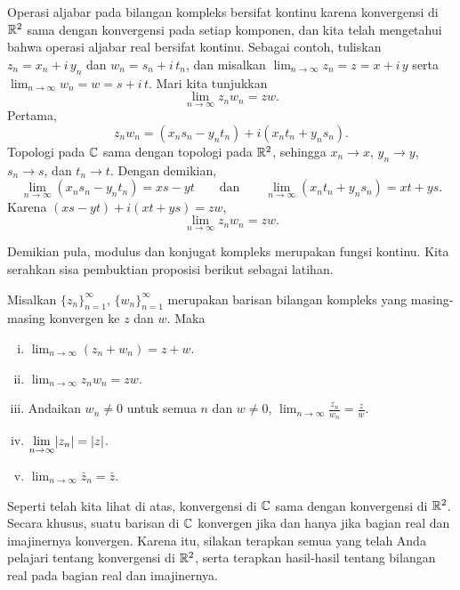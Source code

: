 Operasi aljabar pada bilangan kompleks bersifat kontinu karena konvergensi di
${\mathbb{R}}^2$ sama dengan konvergensi pada setiap komponen, dan kita telah mengetahui
bahwa operasi aljabar real bersifat kontinu. Sebagai contoh,
tuliskan $z_n = x_n + i\,y_n$ dan
$w_n = s_n + i\,t_n$, dan misalkan
$\lim_{n\to\infty} z_n = z = x+i\,y$ serta $\lim_{n\to\infty} w_n = w = s+i\,t$.
Mari kita tunjukkan
\begin{equation*}
\lim_{n\to\infty} z_n w_n = zw .
\end{equation*}
Pertama,
\begin{equation*}
z_n w_n = (x_ns_n-y_nt_n) + i(x_nt_n+y_ns_n) .
\end{equation*}
Topologi pada ${\mathbb{C}}$ sama dengan topologi pada ${\mathbb{R}}^2$, sehingga
$x_n \to x$, $y_n \to y$, $s_n \to s$, dan $t_n \to t$.
Dengan demikian,
\begin{equation*}
\lim_{n\to\infty} (x_ns_n-y_nt_n) = xs-yt \qquad \text{dan} \qquad
\lim_{n\to\infty} (x_nt_n+y_ns_n) = xt+ys .
\end{equation*}
Karena
$(xs-yt)+i(xt+ys) = zw$,
\begin{equation*}
\lim_{n\to\infty} z_n w_n = zw .
\end{equation*}

Demikian pula, modulus dan konjugat kompleks merupakan fungsi kontinu. Kita
serahkan sisa pembuktian proposisi berikut sebagai latihan.

\begin{prop} \label{prop:continuityofcomplex}
Misalkan $\{ z_n \}_{n=1}^\infty$, $\{ w_n \}_{n=1}^\infty$ merupakan barisan bilangan kompleks yang masing-masing konvergen
ke $z$ dan $w$. Maka
\begin{enumerate}[(i)]
\item
$\displaystyle \lim_{n\to \infty} (z_n + w_n) = z + w$.
\item
$\displaystyle \lim_{n\to \infty} z_n w_n = z w$.
\item
Andaikan $w_n \neq 0$ untuk semua $n$ dan $w \neq 0$,
$\displaystyle \lim_{n\to \infty} \frac{z_n}{w_n} = \frac{z}{w}$.
\item
$\displaystyle \lim_{n\to \infty} \lvert {z_n} \rvert = \lvert {z} \rvert$.
\item
$\displaystyle \lim_{n\to \infty} \bar{z}_n = \bar{z}$.
\end{enumerate}
\end{prop}

Seperti telah kita lihat di atas, konvergensi di ${\mathbb{C}}$ sama dengan konvergensi di
${\mathbb{R}}^2$. Secara khusus, suatu barisan di ${\mathbb{C}}$ konvergen jika dan hanya jika
bagian real dan imajinernya konvergen. Karena itu, silakan terapkan
semua yang telah Anda pelajari tentang konvergensi di ${\mathbb{R}}^2$, serta
terapkan hasil-hasil tentang bilangan real pada bagian real dan imajinernya.

